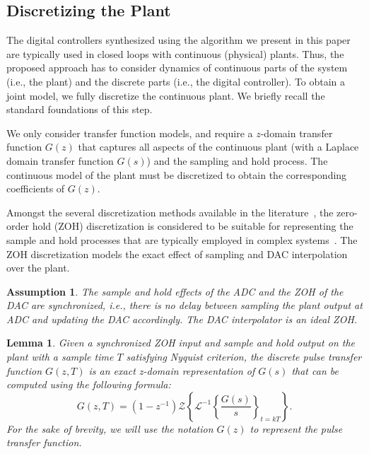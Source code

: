 \documentclass{sig-alternate-05-2015}
\newcommand{\red}[1]{{\color{red}#1}}
\newtheorem{myassumption}{Assumption}
\newtheorem{mylemma}{Lemma}
\begin{document}
\subsection{Discretizing the Plant}
\label{ssec:SandH}

The digital controllers synthesized using the algorithm we present in this
paper are typically used in closed loops with continuous (physical)
plants.  Thus, the proposed approach has to consider dynamics of continuous
parts of the system (i.e., the plant) and the discrete parts (i.e., the
digital controller).  To obtain a joint model, we fully discretize the continuous
plant. We briefly recall the standard foundations of this step.

We only consider transfer function models, and require a $z$-domain
transfer function $G(z)$ that captures all aspects of the continuous plant (with a
Laplace domain transfer function $G(s)$) and the sampling and hold process.
The continuous model of the plant must be discretized to obtain the corresponding 
coefficients of $G(z)$.


Amongst the several discretization methods available in the
literature~\cite{Franklin15}, the zero-order hold (ZOH) discretization is
considered to be suitable for representing the sample and hold processes that are
typically employed in complex systems~\cite{istepanian2012digital}. 
The ZOH discretization models the exact effect of sampling and DAC interpolation over the plant.

\begin{myassumption}
%
The sample and hold effects of the ADC and the ZOH of the DAC are synchronized,
i.e., there is no delay between sampling the plant output at ADC and
updating the DAC accordingly.  The DAC interpolator is an ideal ZOH. 
%
\end{myassumption}

\begin{mylemma}\cite{astrom1997computer}
%
Given a synchronized ZOH input and sample and hold output on the plant with
a sample time $T$ satisfying Nyquist criterion, the discrete pulse
transfer function $G(z,T)$ is an exact z-domain representation of $G(s)$ 
that can be computed using the following formula:
%
\begin{equation}
\label{eq:pulsetf}
G(z,T) = %
(1-z^{-1})\mathcal{Z}\left\lbrace{\mathcal{L}^{-1}\left\lbrace{\frac{G(s)}{s}}\right\rbrace_{t=kT}}\right\rbrace.
\end{equation}
%
For the sake of brevity, we will use the notation $G(z)$ to represent the
pulse transfer function.
%
\end{mylemma}
\end{document}

